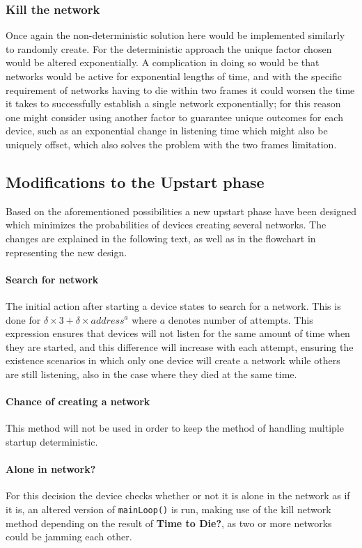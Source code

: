 \subsubsection*{Kill the network}
Once again the non-deterministic solution here would be implemented similarly to randomly create.
For the deterministic approach the unique factor chosen would be altered exponentially.
A complication in doing so would be that networks would be active for exponential lengths of time, and with the specific requirement of networks having to die within two frames it could worsen the time it takes to successfully establish a single network exponentially; for this reason one might consider using another factor to guarantee unique outcomes for each device, such as an exponential change in listening time which might also be uniquely offset, which also solves the problem with the two frames limitation.

\subsection{Modifications to the Upstart phase}
Based on the aforementioned possibilities a new upstart phase have been designed which minimizes the probabilities of devices creating several networks.
The changes are explained in the following text, as well as in the flowchart in  representing the new design.

\paragraph{Search for network}
The initial action after starting a device states to search for a network.
This is done for $\delta \times 3 + \delta \times address^a$ where $a$ denotes number of attempts. 
This expression ensures that devices will not listen for the same amount of time when they are started, and this difference will increase with each attempt, ensuring the existence scenarios in which only one device will create a network while others are still listening, also in the case where they died at the same time.
\paragraph{Chance of creating a network}
This method will not be used in order to keep the method of handling multiple startup deterministic.
\paragraph{Alone in network?}
For this decision the device checks whether or not it is alone in the network as if it is, an altered version of \texttt{mainLoop()} is run, making use of the kill network method depending on the result of \textbf{Time to Die?}, as two or more networks could be jamming each other.
